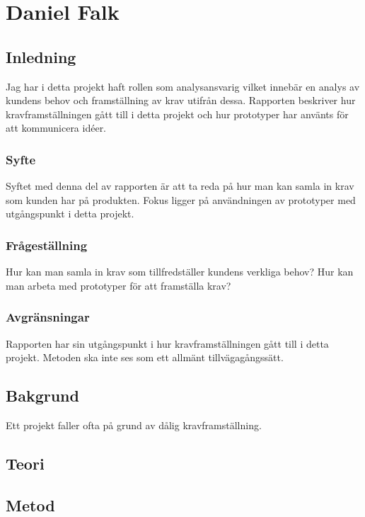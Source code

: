 \section{Daniel Falk}
\subsection{Inledning}
Jag har i detta projekt haft rollen som analysansvarig vilket innebär en analys av kundens behov och framställning av krav utifrån dessa. Rapporten beskriver hur kravframställningen gått till i detta projekt och hur prototyper har använts för att kommunicera idéer.
\subsubsection{Syfte}
Syftet med denna del av rapporten är att ta reda på hur man kan samla in krav som kunden har på produkten. Fokus ligger på användningen av prototyper med utgångspunkt i detta projekt.
\subsubsection{Frågeställning}
Hur kan man samla in krav som tillfredställer kundens verkliga behov?
Hur kan man arbeta med prototyper för att framställa krav?

\subsubsection{Avgränsningar}
Rapporten har sin utgångspunkt i hur kravframställningen gått till i detta projekt. Metoden ska inte ses som ett allmänt tillvägagångssätt.
\subsection{Bakgrund}
Ett projekt faller ofta på grund av dålig kravframställning. %
\subsection{Teori}
\subsection{Metod}
